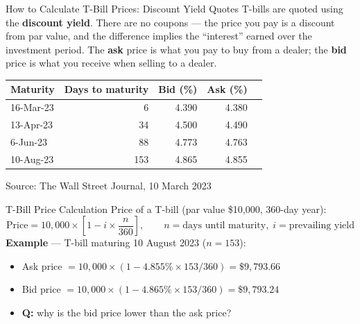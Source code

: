 \documentclass[aspectratio=169]{beamer}
\begin{document}
\begin{frame}{How to Calculate T-Bill Prices: Discount Yield Quotes}
T-bills are quoted using the \textbf{discount yield}. There are no coupons --- the price you pay is a discount from par value, and the difference implies the ``interest'' earned over the investment period. The \textbf{ask} price is what you pay to buy from a dealer; the \textbf{bid} price is what you receive when selling to a dealer.
\begin{table}
\centering
\small
\begin{tabular}{lrrrr}
\toprule
\textbf{Maturity} & \textbf{Days to maturity} & \textbf{Bid (\%)} & \textbf{Ask (\%)} \\
\midrule
16-Mar-23 & 6 & 4.390 & 4.380 \\
13-Apr-23 & 34 & 4.500 & 4.490 \\
6-Jun-23 & 88 & 4.773 & 4.763 \\
10-Aug-23 & 153 & 4.865 & 4.855 \\
\bottomrule
\end{tabular}
\end{table}
\begin{center}
\small Source: The Wall Street Journal, 10 March 2023
\end{center}
\end{frame}

\begin{frame}{T-Bill Price Calculation}
Price of a T-bill (par value \$10{,}000, 360-day year):
\[
\text{Price} = 10{,}000 \times \left[1 - i \times \frac{n}{360}\right],
\qquad n = \text{days until maturity},\; i = \text{prevailing yield}
\]
\textbf{Example} --- T-bill maturing 10 August 2023 ($n = 153$):
\begin{itemize}
  \item Ask price $= 10{,}000 \times (1 - 4.855\% \times 153/360) = \$9{,}793.66$
  \item Bid price $= 10{,}000 \times (1 - 4.865\% \times 153/360) = \$9{,}793.24$
  \item \textbf{Q:} why is the bid price lower than the ask price?
\end{itemize}
\end{frame}
\end{document}
